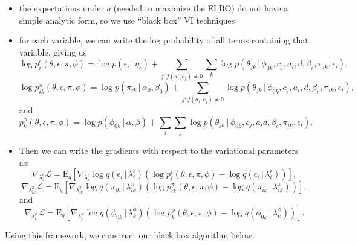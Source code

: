 \documentclass{article}
\newcommand{\E}{\mathrm{E}}
\newcommand{\g}{\, | \,}
\begin{document}
\begin{itemize}
\item the expectations under $q$ (needed to maximize the ELBO) do not have a simple analytic form, so we use ``black box'' VI techniques
\item for each variable, we can write the log probability of all terms containing that variable, giving us 
\[\log p^\epsilon_{i}(\theta, \epsilon, \pi, \phi) = \log p(\epsilon_{i} \g \eta_\epsilon) + \sum_{j : f(a_i, c_j) \neq 0}\sum_k\log p(\theta_{jk} \g \phi_{0k}, c_j, a_i, d, \beta_c, \pi_{ik}, \epsilon_i),\]
\[\log p^\pi_{ik}(\theta, \epsilon, \pi, \phi) = \log p(\pi_{ik} \g \alpha_0, \beta_0) + \sum_{j : f(a_i, c_j) \neq 0}\log p(\theta_{jk} \g \phi_{0k}, c_j, a_i, d, \beta_c, \pi_{ik}, \epsilon_i),\]
and
\[p^\phi_{k}(\theta, \epsilon, \pi, \phi) = \log p(\phi_{0k} \g \alpha, \beta) + \sum_i\sum_{j} \log p(\theta_{jk} \g \phi_{0k}, c_j, a_i d, \beta_c, \pi_{ik}, \epsilon_i).\]
\item Then we can write the gradients with respect to the variational parameters as:
\[\nabla_{\lambda^\epsilon_{i}} \mathcal{L} = \E_q \left[ \nabla_{\lambda^\epsilon_{i}} \log q(\epsilon_{i} \g \lambda^\epsilon_{i}) \left( \log p^\epsilon_{i}(\theta, \epsilon, \pi, \phi) - \log q(\epsilon_{i} \g \lambda^\epsilon_{i}) \right)\right],\]
\[\nabla_{\lambda^\pi_{ik}} \mathcal{L} = \E_q \left[ \nabla_{\lambda^\pi_{ik}} \log q(\pi_{ik} \g \lambda^\pi_{ik}) \left( \log p^\pi_{ik}(\theta, \epsilon, \pi, \phi) - \log q(\pi_{ik} \g \lambda^\pi_{ik}) \right)\right],\]
and
\[\nabla_{\lambda^\phi_{k}} \mathcal{L} = \E_q \left[ \nabla_{\lambda^\phi_{k}} \log q(\phi_{0k} \g \lambda^\phi_{k}) \left( \log p^\phi_{k}(\theta, \epsilon, \pi, \phi) - \log q(\phi_{0k} \g \lambda^\phi_{k}) \right)\right].\]
\end{itemize}

Using this framework, we construct our black box algorithm below. 
\end{document}
